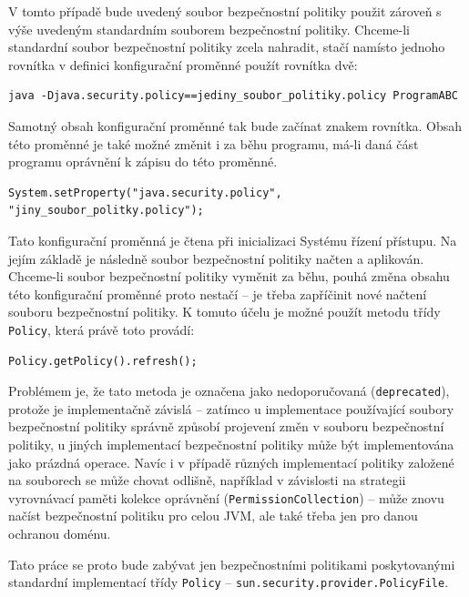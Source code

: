 V tomto případě bude uvedený soubor bezpečnostní politiky použit zároveň s výše uvedeným standardním souborem bezpečnostní politiky. Chceme-li standardní soubor bezpečnostní politiky zcela nahradit, stačí namísto jednoho rovnítka v definici konfigurační proměnné použít rovnítka dvě: \cite[5.3.1]{oaks}

\begin{verbatim}
java -Djava.security.policy==jediny_soubor_politiky.policy ProgramABC
\end{verbatim}

Samotný obsah konfigurační proměnné tak bude začínat znakem rovnítka. Obsah této proměnné je také možné změnit i za běhu programu, má-li daná část programu oprávnění k zápisu do této proměnné.

\begin{verbatim}
System.setProperty("java.security.policy", "jiny_soubor_politky.policy");
\end{verbatim}

Tato konfigurační proměnná je čtena při inicializaci Systému řízení přístupu. Na jejím základě je následně soubor bezpečnostní politiky načten a aplikován. Chceme-li soubor bezpečnostní politiky vyměnit za běhu, pouhá změna obsahu této konfigurační proměnné proto nestačí -- je třeba zapříčinit nové načtení souboru bezpečnostní politiky. K tomuto účelu je možné použít metodu třídy {\tt Policy}, která právě toto provádí:

\begin{verbatim}
Policy.getPolicy().refresh();
\end{verbatim}

Problémem je, že tato metoda je označena jako nedoporučovaná ({\tt deprecated}), protože je implementačně závislá -- zatímco u implementace používající soubory bezpečnostní politiky správně způsobí projevení změn v souboru bezpečnostní politiky, u jiných implementací bezpečnostní politiky může být implementována jako prázdná operace. Navíc i v případě různých implementací politiky založené na souborech se může chovat odlišně, například v závislosti na strategii vyrovnávací paměti kolekce oprávnění ({\tt PermissionCollection}) -- může znovu načíst bezpečnostní politiku pro celou JVM, ale také třeba jen pro danou ochranou doménu. \cite{refPolicy}

Tato práce se proto bude zabývat jen bezpečnostními politikami poskytovanými standardní implementací třídy {\tt Policy} -- {\tt sun.security.provider.PolicyFile}.

